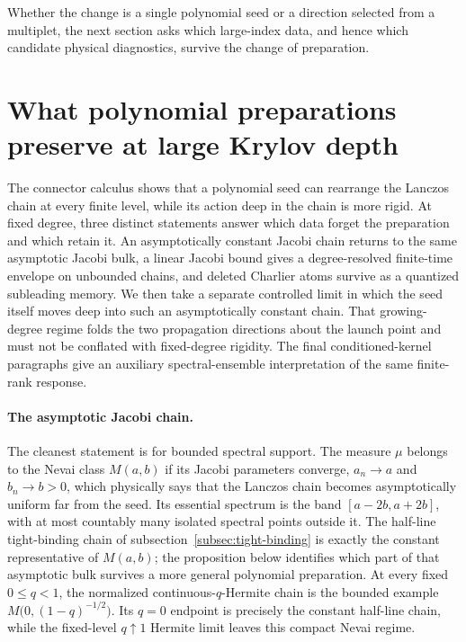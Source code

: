 \documentclass[a4paper,11pt]{article}
\theoremstyle{definition}
\theoremstyle{remark}
\begin{document}
Whether the change is a single polynomial seed or a direction selected from a multiplet, the
next section asks which large-index data, and hence which candidate physical diagnostics, survive
the change of preparation.
 
\section{What polynomial preparations preserve at large Krylov depth}
\label{sec:rigidity}

The connector calculus shows that a polynomial seed can rearrange the Lanczos chain at every
finite level, while its action deep in the chain is more rigid.  At fixed degree, three distinct
statements answer which data forget the preparation and which retain it.  An asymptotically constant Jacobi chain  
returns to the same asymptotic Jacobi bulk, a linear Jacobi bound gives a degree-resolved
finite-time envelope on unbounded chains, and deleted Charlier atoms survive as a quantized
subleading memory.  We then take a separate controlled limit in which the seed itself moves deep
into such an asymptotically constant chain.  That growing-degree regime folds the two propagation directions about
the launch point and must not be conflated with fixed-degree rigidity.  The final conditioned-kernel
paragraphs give an auxiliary spectral-ensemble interpretation of the same finite-rank response.

\paragraph{The asymptotic Jacobi chain.}
\label{subsec:jacobi-limit-rigidity}

The cleanest statement is for bounded spectral support. The measure $\mu$ belongs to the Nevai class $M(a,b)$ \cite{Nevai1979,SimonOPRL1} if its Jacobi parameters converge, $a_n\to a$ and $b_n\to b>0$, which physically says that the Lanczos chain becomes asymptotically uniform far from the seed. Its essential spectrum is the band $[a-2b,a+2b]$, with at most countably many isolated spectral points outside it. 
 The half-line tight-binding chain of subsection~\ref{subsec:tight-binding} is exactly the 
constant representative of $M(a,b)$; the proposition below identifies which part of that
asymptotic bulk survives a more general polynomial preparation.
At every fixed $0\le q<1$, the normalized continuous-$q$-Hermite chain is the bounded
example $M\bigl(0,(1-q)^{-1/2}\bigr)$.  Its $q=0$ endpoint is precisely the constant half-line
chain, while the fixed-level $q\uparrow1$ Hermite limit leaves this compact Nevai regime.
\end{document}
